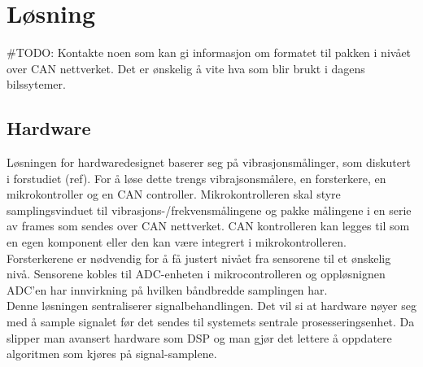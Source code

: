 \chapter{Løsning}

#TODO: Kontakte noen som kan gi informasjon om formatet til pakken i nivået over
CAN nettverket. Det er ønskelig å vite hva som blir brukt i dagens bilssytemer.

\section{Hardware}

Løsningen for hardwaredesignet baserer seg på vibrasjonsmålinger, som diskutert
i forstudiet (ref). For å løse dette trengs vibrajsonsmålere, en forsterkere,
en mikrokontroller og en CAN controller. Mikrokontrolleren skal styre
samplingsvinduet til vibrasjons-/frekvensmålingene og pakke målingene i en serie
av frames som sendes over CAN nettverket. CAN kontrolleren kan legges til som en
egen komponent eller den kan være integrert i mikrokontrolleren. Forsterkerene er
nødvendig for å få justert nivået fra sensorene til et ønskelig nivå. Sensorene
kobles til ADC-enheten i mikrocontrolleren og oppløsnignen ADC'en
har innvirkning på hvilken båndbredde samplingen har. \\

Denne løsningen sentraliserer signalbehandlingen. Det vil si at hardware nøyer
seg med å sample signalet før det sendes til systemets sentrale
prosesseringsenhet. Da slipper man avansert hardware som DSP og man gjør det
lettere å oppdatere algoritmen som kjøres på signal-samplene.
